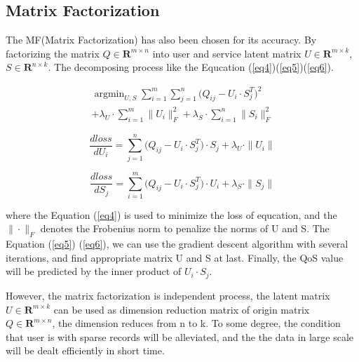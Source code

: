 \documentclass[conference]{IEEEtran}
\begin{document}
\subsection{Matrix Factorization}
The MF(Matrix Factorization) has also been chosen for its accuracy. By factorizing the matrix $Q \in \textbf{R}^{m \times n} $ into user and service latent matrix $U \in \textbf{R}^{m \times k}$, $S \in \textbf{R}^{n \times k}$. The decomposing process like  the Equcation (\ref{eq4})(\ref{eq5})(\ref{eq6}).

\begin{equation}
\begin{aligned}
\mathop{\arg\min}_{U,S} \sum_{i=1}^{m}{\sum_{j=1}^{n}{
(Q_{ij}-U_{i} \cdot S_{j}^{T}})^{2}
} \\
+ \lambda_{U} \cdot \sum_{i=1}^{m}\|U_{i}\|_{F}^{2}
+ \lambda_{S} \cdot \sum_{i=1}^{n}\|S_{i}\|_{F}^{2}
\label{eq4}
\end{aligned}
\end{equation}

\begin{equation}
{\frac{dloss}{dU_{i}}={\sum_{j=1}^{n}{
(Q_{ij}-U_{i} \cdot S_{j}^{T}}) \cdot S_{j}
} 
+ \lambda_{U} \cdot \|U_{i}\|
\label{eq5}
} 
\end{equation}

\begin{equation}
\frac{dloss}{dS_{j}}={\sum_{i=1}^{m}{
(Q_{ij}-U_{i} \cdot S_{j}^{T}}) \cdot U_{i}
}
+ \lambda_{S} \cdot \|S_{j}\|
\label{eq6}
\end{equation}

where the Equation (\ref{eq4}) is used to minimize the loss of equcation, and the $\| \cdot \|_{F}$ denotes the Frobenius norm to penalize the norms of U and S. The Equation (\ref{eq5}) (\ref{eq6}), we can use the gradient descent algorithm with several iterations, and find appropriate matrix U and S at last. Finally, the QoS value will be predicted by the inner product of $U_{i} \cdot S_{j}$. 
\par However, the matrix factorization is independent process, the latent matrix $U \in \textbf{R}^{m \times k}$ can be used as dimension reduction matrix of origin matrix $Q \in \textbf{R}^{m \times n}$, the dimension reduces from n to k. To some degree, the condition that user is with sparse records will be alleviated, and the the data in large scale will be dealt efficiently in short time.
\end{document}

